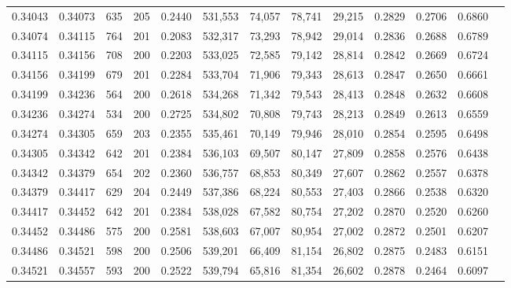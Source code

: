 \begin{tabular}{rrrrrrrrrrrrr}
0.34043 & 0.34073 &   635 & 205 &                                     0.2440 & 531,553 &  74,057 &  78,741 &  29,215 & 0.2829 & 0.2706 & 0.6860 \\
0.34074 & 0.34115 &   764 & 201 &                                     0.2083 & 532,317 &  73,293 &  78,942 &  29,014 & 0.2836 & 0.2688 & 0.6789 \\
0.34115 & 0.34156 &   708 & 200 &                                     0.2203 & 533,025 &  72,585 &  79,142 &  28,814 & 0.2842 & 0.2669 & 0.6724 \\
0.34156 & 0.34199 &   679 & 201 &                                     0.2284 & 533,704 &  71,906 &  79,343 &  28,613 & 0.2847 & 0.2650 & 0.6661 \\
0.34199 & 0.34236 &   564 & 200 &                                     0.2618 & 534,268 &  71,342 &  79,543 &  28,413 & 0.2848 & 0.2632 & 0.6608 \\
0.34236 & 0.34274 &   534 & 200 &                                     0.2725 & 534,802 &  70,808 &  79,743 &  28,213 & 0.2849 & 0.2613 & 0.6559 \\
0.34274 & 0.34305 &   659 & 203 &                                     0.2355 & 535,461 &  70,149 &  79,946 &  28,010 & 0.2854 & 0.2595 & 0.6498 \\
0.34305 & 0.34342 &   642 & 201 &                                     0.2384 & 536,103 &  69,507 &  80,147 &  27,809 & 0.2858 & 0.2576 & 0.6438 \\
0.34342 & 0.34379 &   654 & 202 &                                     0.2360 & 536,757 &  68,853 &  80,349 &  27,607 & 0.2862 & 0.2557 & 0.6378 \\
0.34379 & 0.34417 &   629 & 204 &                                     0.2449 & 537,386 &  68,224 &  80,553 &  27,403 & 0.2866 & 0.2538 & 0.6320 \\
0.34417 & 0.34452 &   642 & 201 &                                     0.2384 & 538,028 &  67,582 &  80,754 &  27,202 & 0.2870 & 0.2520 & 0.6260 \\
0.34452 & 0.34486 &   575 & 200 &                                     0.2581 & 538,603 &  67,007 &  80,954 &  27,002 & 0.2872 & 0.2501 & 0.6207 \\
0.34486 & 0.34521 &   598 & 200 &                                     0.2506 & 539,201 &  66,409 &  81,154 &  26,802 & 0.2875 & 0.2483 & 0.6151 \\
0.34521 & 0.34557 &   593 & 200 &                                     0.2522 & 539,794 &  65,816 &  81,354 &  26,602 & 0.2878 & 0.2464 & 0.6097 \\

\end{tabular}
